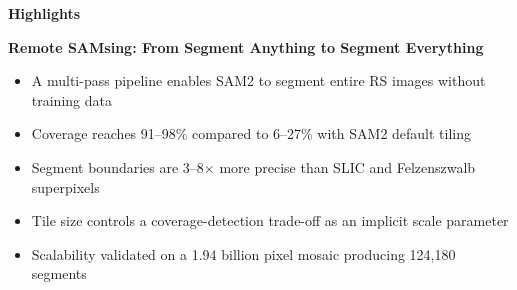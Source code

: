 \documentclass[11pt]{article}
\begin{document}
\noindent\textbf{\Large Highlights}

\vspace{0.5cm}
\noindent\textbf{Remote SAMsing: From Segment Anything to Segment Everything}

\vspace{0.5cm}
\begin{itemize}[leftmargin=*,itemsep=6pt]
    \item A multi-pass pipeline enables SAM2 to segment entire RS images without training data
    \item Coverage reaches 91--98\% compared to 6--27\% with SAM2 default tiling
    \item Segment boundaries are 3--8$\times$ more precise than SLIC and Felzenszwalb superpixels
    \item Tile size controls a coverage-detection trade-off as an implicit scale parameter
    \item Scalability validated on a 1.94 billion pixel mosaic producing 124{,}180 segments
\end{itemize}
\end{document}

